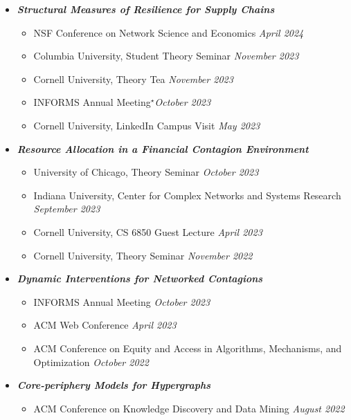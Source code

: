 \documentclass[margin]{res}
\newcommand{\presentedbycoauthor}[0]{\ensuremath {^{\star}}}
\newcommand{\bemph}[1]{\textbf{\emph{#1}}}
\begin{document}
\begin{resume}
\begin{itemize}[nosep]
	\item \bemph{Structural Measures of Resilience for Supply Chains}
	\begin{itemize}[nosep]
		\item NSF Conference on Network Science and Economics \hfill \emph{April 2024}
		\item Columbia University, Student Theory Seminar \hfill \emph{November 2023}
		\item Cornell University, Theory Tea \hfill \emph{November 2023}
		\item INFORMS Annual Meeting\presentedbycoauthor \hfill \emph{October 2023}
		\item Cornell University, LinkedIn Campus Visit \hfill \emph{May 2023}
	\end{itemize}

	\item \bemph{Resource Allocation in a Financial Contagion Environment}
	\begin{itemize}[nosep]
		\item University of Chicago, Theory Seminar \hfill \emph{October 2023}
		\item Indiana University, Center for Complex Networks and Systems Research \\ \hfill \emph{September 2023} 
		\item Cornell University, CS 6850 Guest Lecture \hfill \emph{April 2023}
		\item Cornell University, Theory Seminar \hfill \emph{November 2022}
	\end{itemize}
	
	\item \bemph{Dynamic Interventions for Networked Contagions}
	\begin{itemize}[nosep]
		\item INFORMS Annual Meeting \hfill \emph{October 2023}
		\item ACM Web Conference \hfill \emph{April 2023}	
		\item ACM Conference on Equity and Access in Algorithms, Mechanisms, and Optimization \hfill \emph{October 2022}
	\end{itemize}

	\item \bemph{Core-periphery Models for Hypergraphs}
	\begin{itemize}[nosep]
		\item ACM Conference on Knowledge Discovery and Data Mining \hfill \emph{August 2022}
	\end{itemize}
	

\end{itemize}
\end{resume}
\end{document}

